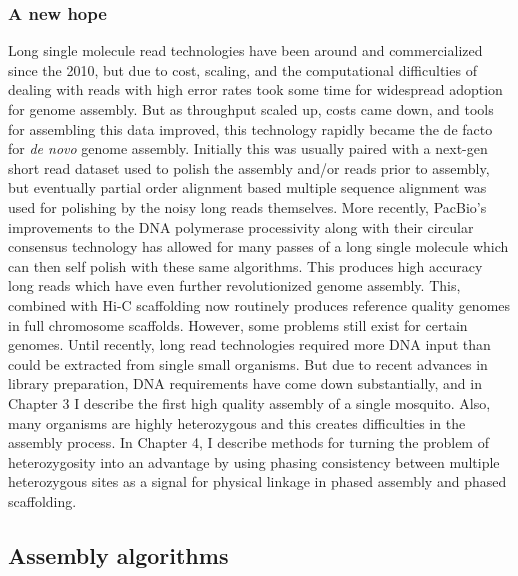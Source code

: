 \subsubsection{A new hope}

\par{
Long single molecule read technologies have been around and commercialized since the 2010, but due to cost, scaling, and the computational difficulties of dealing with reads with high error rates took some time for widespread adoption for genome assembly\cite{HGAP}. But as throughput scaled up, costs came down, and tools for assembling this data improved\cite{falcon}\cite{redbean}\cite{canu}, this technology rapidly became the de facto for \textit{de novo} genome assembly. Initially this was usually paired with a next-gen short read dataset used to polish the assembly and/or reads prior to assembly, but eventually partial order alignment based multiple sequence alignment\cite{partialorder} was used for polishing by the noisy long reads themselves\cite{quiver}. More recently, PacBio's improvements to the DNA polymerase processivity along with their circular consensus technology has allowed for many passes of a long single molecule which can then self polish with these same algorithms. This produces high accuracy long reads which have even further revolutionized genome assembly\cite{HIFI}. This, combined with Hi-C scaffolding now routinely produces reference quality genomes in full chromosome scaffolds. However, some problems still exist for certain genomes. Until recently, long read technologies required more DNA input than could be extracted from single small organisms. But due to recent advances in library preparation, DNA requirements have come down substantially, and in Chapter 3 I describe the first high quality assembly of a single mosquito. Also, many organisms are highly heterozygous and this creates difficulties in the assembly process. In Chapter 4, I describe methods for turning the problem of heterozygosity into an advantage by using phasing consistency between multiple heterozygous sites as a signal for physical linkage in phased assembly and phased scaffolding.
}

\subsection{Assembly algorithms}


